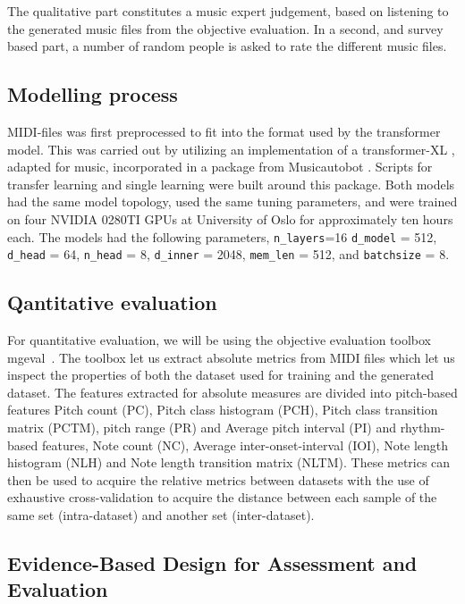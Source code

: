 \documentclass{IEEEtran}
\begin{document}
The qualitative part constitutes a music expert judgement, based on listening
to the generated music files from the objective evaluation. In a second, and
survey based part, a number of random people is asked to rate the different
music files.

\subsection{Modelling process}

MIDI-files was first preprocessed to fit into
the format used by the transformer model. This was carried out by utilizing
an implementation of a transformer-XL \cite{dai2019transformerxl}, adapted for 
music, incorporated in a
package from Musicautobot \cite{musicautobot}. Scripts for transfer learning
and single learning were built around this package. Both models had the same
model topology, used the same tuning parameters, and were trained on 
four NVIDIA 0280TI GPUs at University of Oslo for approximately ten 
hours each. The models had the following parameters, \lstinline|n_layers|=16
\lstinline|d_model| = 512, \lstinline|d_head| = 64,
\lstinline|n_head| = 8, \lstinline|d_inner| = 2048, \lstinline|mem_len| = 512,
and \lstinline|batchsize| = 8.

\subsection{Qantitative evaluation}

For quantitative evaluation, we will be using the objective evaluation
toolbox mgeval~\cite{yang2020evaluation}. The toolbox let us extract absolute
metrics from MIDI files which let us inspect the properties of both the
dataset used for training and the generated dataset. The features extracted
for absolute measures are divided into pitch-based features Pitch count (PC),
Pitch class histogram (PCH), Pitch class transition matrix (PCTM), pitch
range (PR) and Average pitch interval (PI) and rhythm-based features, Note
count (NC), Average inter-onset-interval (IOI), Note length histogram (NLH)
and Note length transition matrix (NLTM). These metrics can then be used to
acquire the relative metrics between datasets with the use of exhaustive
cross-validation to acquire the distance between each sample of the same set
(intra-dataset) and another set (inter-dataset).

\subsection{Evidence-Based Design for Assessment and Evaluation}
\end{document}

